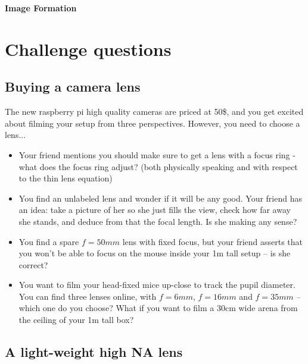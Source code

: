 \documentclass[a4paper]{report}
\begin{document}
	\setcounter{secnumdepth}{2}

	\begin{center}
		\textbf{\Large{Image Formation}}
	\end{center}

	\section{Challenge questions}


    \subsection{Buying a camera lens}
    \hypertarget{hintBack-buying}{}
    The new raspberry pi high quality cameras are priced at 50\$, and you get excited about filming your setup from three perspectives. However, you need to choose a lens...

    \begin{itemize}
        \item Your friend mentions you should make sure to get a lens with a focus ring - what does the focus ring adjust? (both physically speaking and with respect to the thin lens equation)
        \item You find an unlabeled lens and wonder if it will be any good. Your friend has an idea: take a picture of her so she just fills the view, check how far away she stands, and deduce from that the focal length. Is she making any sense?
        \item You find a spare $f=50mm$ lens with fixed focus, but your friend asserts that you won't be able to focus on the mouse inside your 1m tall setup -- is she correct?
        \item You want to film your head-fixed mice up-close to track the pupil diameter. You can find three lenses online, with $f=6mm$, $f=16mm$ and $f=35mm$ -- which one do you choose? What if you want to film a 30cm wide arena from the ceiling of your 1m tall box?
    \end{itemize}



    \subsection{A light-weight high NA lens}
	\hypertarget{hintBack-fresnel}{}
\end{document}

